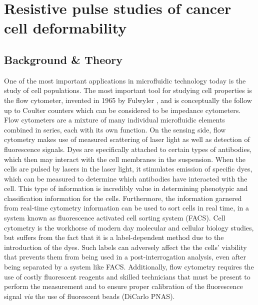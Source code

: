 \graphicspath{{../images/ch5/}}	%


\chapter{Resistive pulse studies of cancer cell deformability}

	

	\section{Background \& Theory}
	      
		One of the most important applications in microfluidic technology today is the study of cell populations. The most important tool for studying cell properties is the flow cytometer, invented in 1965 by Fulwyler \cite{Fulwyler1965}, and is conceptually the follow up to Coulter counters which can be considered to be impedance cytometers. Flow cytometers are a mixture of many individual microfluidic elements combined in series, each with its own function. On the sensing side, flow cytometry makes use of measured scattering of laser light as well as detection of fluorescence signals. Dyes are specifically attached to certain types of antibodies, which then may interact with the cell membranes in the suspension. When the cells are pulsed by lasers in the laser light, it stimulates emission of specific dyes, which can be measured to determine which antibodies have interacted with the cell. This type of information is incredibly value in determining phenotypic and classification information for the cells. Furthermore, the information garnered from real-time cytometry information can be used to sort cells in real time, in a system known as fluorescence activated cell sorting system (FACS). Cell cytometry is the workhorse of modern day molecular and cellular biology studies, but suffers from the fact that it is a label-dependent method due to the introduction of the dyes. Such labels can adversely affect the the cells' viability that prevents them from being used in a post-interrogation analysis, even after being separated by a system like FACS. Additionally, flow cytometry requires the use of costly fluorescent reagents and skilled technicians that must be present to perform the measurement and to ensure proper calibration of the fluorescence signal \textit{via} the use of fluorescent beads \cite{Gosset2012} (DiCarlo PNAS).
	
